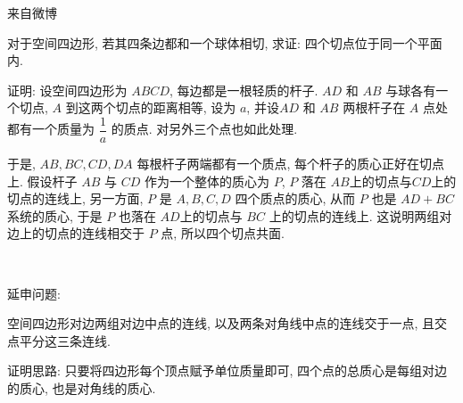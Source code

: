 \noindent 来自微博

对于空间四边形, 若其四条边都和一个球体相切, 求证: 四个切点位于同一个平面内.
\begin{figure*}[htbp]
\centering
{}
\end{figure*}

证明: 设空间四边形为 $ABCD$, 每边都是一根轻质的杆子. $AD$ 和 $AB$ 与球各有一个切点, $A$ 到这两个切点的距离相等, 设为 $a$, 并设$AD$ 和 $AB$ 两根杆子在 $A$ 点处都有一个质量为 $\dfrac{1}{a}$ 的质点. 对另外三个点也如此处理. 

于是, $AB, BC, CD, DA$ 每根杆子两端都有一个质点, 每个杆子的质心正好在切点上. 假设杆子 $AB$ 与 $CD$ 作为一个整体的质心为 $P$, $P$ 落在 $AB$上的切点与$CD$上的切点的连线上, 另一方面, $P$ 是 $A,B,C,D$ 四个质点的质心, 从而 $P$ 也是 $AD + BC$ 系统的质心, 于是 $P$ 也落在 $AD$上的切点与 $BC$ 上的切点的连线上. 这说明两组对边上的切点的连线相交于 $P$ 点, 所以四个切点共面.

~

\noindent 延申问题: 

空间四边形对边两组对边中点的连线, 以及两条对角线中点的连线交于一点, 且交点平分这三条连线. 

证明思路: 只要将四边形每个顶点赋予单位质量即可, 四个点的总质心是每组对边的质心, 也是对角线的质心.


\newpage





































